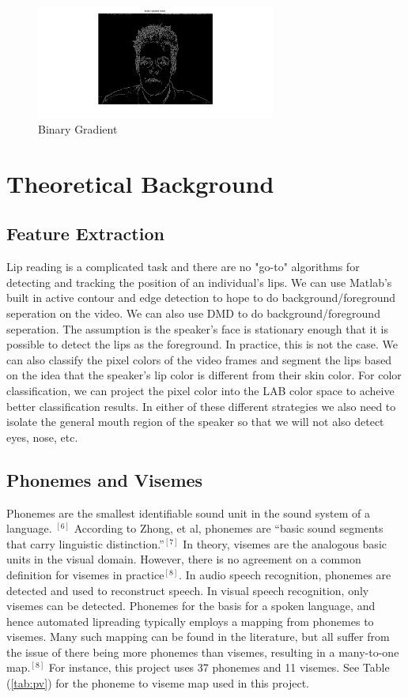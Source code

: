 \documentclass[a4paper]{article}
\begin{document}
\begin{figure}[H] 
	\centering
	\includegraphics[width=0.7\textwidth]{binary}
	\caption{Binary Gradient}	
\end{figure}
\section{Theoretical Background}
\label{sec:theory}
\subsection{Feature Extraction}
Lip reading is a complicated task and there are no "go-to" algorithms for detecting and tracking the position of an individual's lips. We can use Matlab's built in active contour and edge detection to hope to do background/foreground seperation on the video. We can also use DMD to do background/foreground seperation. The assumption is the speaker's face is stationary enough that it is possible to detect the lips as the foreground. In practice, this is not the case. We can also classify the pixel colors of the video frames and segment the lips based on the idea that the speaker's lip color is different from their skin color. For color classification, we can project the pixel color into the LAB color space to acheive better classification results. In either of these different strategies we also need to isolate the general mouth region of the speaker so that we will not also detect eyes, nose, etc.
\subsection{Phonemes and Visemes}
Phonemes are the smallest identifiable sound unit in the sound system of a language. $^{[6]}$  According to Zhong, et al, phonemes are ``basic sound segments that carry linguistic distinction.''$^{[7]}$ In theory, visemes are the analogous basic units in the visual domain.  However, there is no agreement on a common definition for visemes in practice$^{[8]}$.  In audio speech recognition, phonemes are detected and used to reconstruct speech.  In visual speech recognition, only visemes can be detected.  Phonemes for the basis for a spoken language, and hence automated lipreading typically employs a mapping from phonemes to visemes.  Many such mapping can be found in the literature, but all suffer from the issue of there being more phonemes than visemes, resulting in a many-to-one map.$^{[8]}$  For instance, this project uses 37 phonemes and 11 visemes. See Table (\ref{tab:pv}) for the phoneme to viseme map used in this project.  
\end{document}
